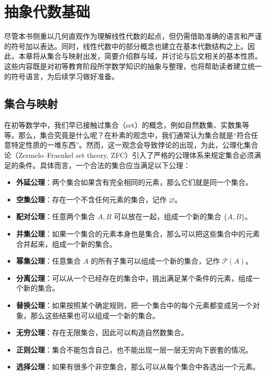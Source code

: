 \chapter{抽象代数基础}
尽管本书侧重以几何直观作为理解线性代数的起点，但仍需借助准确的语言和严谨的符号加以表达。同时，线性代数中的部分概念也建立在基本代数结构之上。因此，本章将从集合与映射出发，简要介绍群与域，并讨论与后文相关的基本性质。这些内容既是对初等教育阶段所学数学知识的抽象与整理，也将帮助读者建立统一的符号语言，为后续学习做好准备。

\section{集合与映射}

在初等数学中，我们早已接触过集合（set）的概念，例如自然数集、实数集等等。那么，集合究竟是什么呢？在朴素的观念中，我们通常认为集合就是``符合任意特定性质的一堆东西''。然而，这一观念会导致悖论的出现，为此，公理化集合论（Zermelo–Fraenkel set theory, ZFC）引入了严格的公理体系来规定集合必须满足的条件。具体而言，一个合法的集合应当满足以下公理：
\begin{itemize}
    \item \textbf{外延公理}：两个集合如果含有完全相同的元素，那么它们就是同一个集合。
    \item \textbf{空集公理}：存在一个不含任何元素的集合，记作 \(\varnothing\)。
    \item \textbf{配对公理}：任意两个集合 \(A,B\) 可以放在一起，组成一个新的集合 \(\{A,B\}\)。
    \item \textbf{并集公理}：如果一个集合的元素本身也是集合，那么可以把这些集合中的元素合并起来，组成一个新的集合。
    \item \textbf{幂集公理}：任意集合 \(A\) 的所有子集可以组成一个新的集合，记作 \(\mathcal P(A)\)。
    \item \textbf{分离公理}：可以从一个已经存在的集合中，挑出满足某个条件的元素，组成一个新的集合。
    \item \textbf{替换公理}：如果按照某个确定规则，把一个集合中的每个元素都变成另一个对象，那么这些结果也可以组成一个新的集合。
    \item \textbf{无穷公理}：存在无限集合，因此可以构造自然数集合。
    \item \textbf{正则公理}：集合不能包含自己，也不能出现一层一层无穷向下嵌套的情况。
    \item \textbf{选择公理}：如果有很多个非空集合，那么可以从每个集合中各选出一个元素。
\end{itemize}

